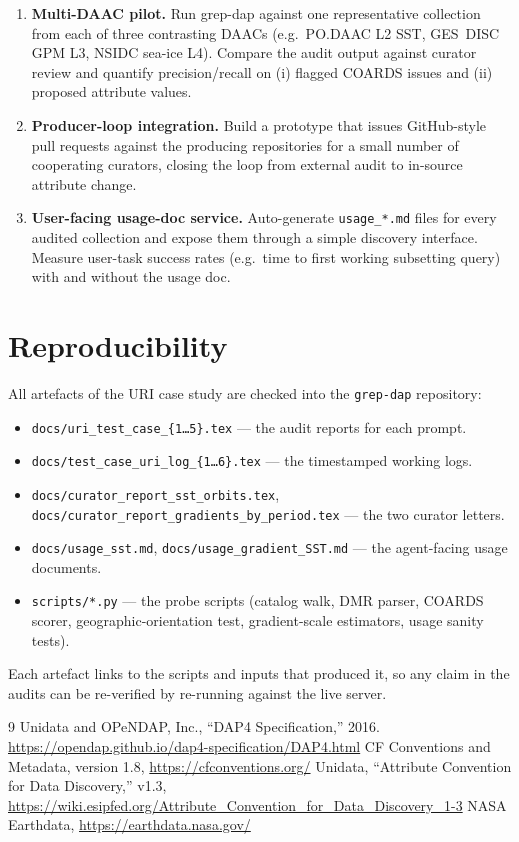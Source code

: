 \documentclass[11pt]{article}
\begin{document}
\begin{enumerate}[topsep=2pt,leftmargin=2em]
  \item \textbf{Multi-DAAC pilot.} Run grep-dap against one
    representative collection from each of three contrasting
    DAACs (e.g.\ PO.DAAC L2 SST, GES~DISC GPM L3, NSIDC sea-ice
    L4). Compare the audit output against curator review and
    quantify precision/recall on (i) flagged COARDS issues and
    (ii) proposed attribute values.
  \item \textbf{Producer-loop integration.} Build a prototype
    that issues GitHub-style pull requests against the producing
    repositories for a small number of cooperating curators,
    closing the loop from external audit to in-source attribute
    change.
  \item \textbf{User-facing usage-doc service.} Auto-generate
    \texttt{usage\_*.md} files for every audited collection and
    expose them through a simple discovery interface. Measure
    user-task success rates (e.g.\ time to first working
    subsetting query) with and without the usage doc.
\end{enumerate}

\section{Reproducibility}\label{sec:repro}

All artefacts of the URI case study are checked into the
\texttt{grep-dap} repository:

\begin{itemize}[topsep=2pt]
  \item \texttt{docs/uri\_test\_case\_\{1\dots5\}.tex} --- the
    audit reports for each prompt.
  \item \texttt{docs/test\_case\_uri\_log\_\{1\dots6\}.tex} ---
    the timestamped working logs.
  \item \texttt{docs/curator\_report\_sst\_orbits.tex},
    \texttt{docs/curator\_report\_gradients\_by\_period.tex} ---
    the two curator letters.
  \item \texttt{docs/usage\_sst.md},
    \texttt{docs/usage\_gradient\_SST.md} --- the agent-facing
    usage documents.
  \item \texttt{scripts/*.py} --- the probe scripts (catalog
    walk, DMR parser, COARDS scorer, geographic-orientation
    test, gradient-scale estimators, usage sanity tests).
\end{itemize}

Each artefact links to the scripts and inputs that produced it,
so any claim in the audits can be re-verified by re-running
against the live server.

\begin{thebibliography}{9}
 Unidata and OPeNDAP, Inc., ``DAP4 Specification,''
  2016. \url{https://opendap.github.io/dap4-specification/DAP4.html}
 CF Conventions and Metadata, version 1.8,
  \url{https://cfconventions.org/}
 Unidata, ``Attribute Convention for Data
  Discovery,'' v1.3,
  \url{https://wiki.esipfed.org/Attribute_Convention_for_Data_Discovery_1-3}
 NASA Earthdata,
  \url{https://earthdata.nasa.gov/}
\end{thebibliography}
\end{document}
